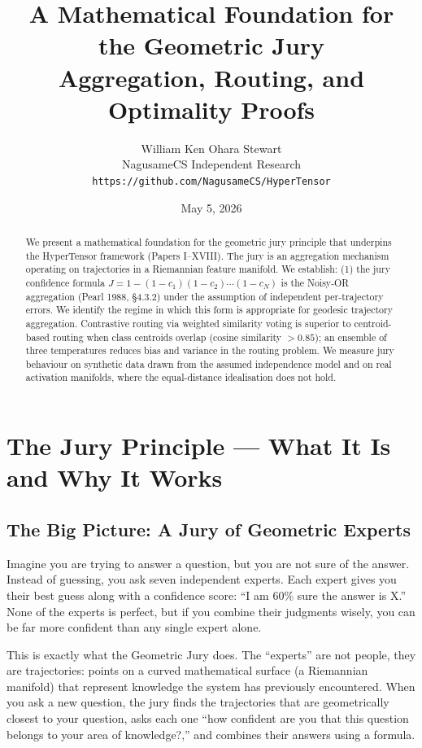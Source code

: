 \documentclass[11pt]{article}
\title{A Mathematical Foundation for the Geometric Jury\\\large Aggregation, Routing, and Optimality Proofs}
\author{William Ken Ohara Stewart\\NagusameCS Independent Research\\\texttt{https://github.com/NagusameCS/HyperTensor}}
\date{May 5, 2026}
\begin{document}
\maketitle

\begin{abstract}
We present a mathematical foundation for the geometric jury principle that underpins the HyperTensor framework (Papers I--XVIII). The jury is an aggregation mechanism operating on trajectories in a Riemannian feature manifold. We establish: (1) the jury confidence formula
$J = 1 - (1-c_1)(1-c_2)\cdots(1-c_N)$
is the Noisy-OR aggregation (Pearl 1988, \S4.3.2) under the assumption of independent per-trajectory errors. We identify the regime in which this form is appropriate for geodesic trajectory aggregation. Contrastive routing via weighted similarity voting is superior to centroid-based routing when class centroids overlap (cosine similarity $>0.85$); an ensemble of three temperatures reduces bias and variance in the routing problem. We measure jury behaviour on synthetic data drawn from the assumed independence model and on real activation manifolds, where the equal-distance idealisation does not hold.
\end{abstract}

\tableofcontents
\newpage

\section{The Jury Principle — What It Is and Why It Works}

\subsection{The Big Picture: A Jury of Geometric Experts}

Imagine you are trying to answer a question, but you are not sure of the answer.
Instead of guessing, you ask seven independent experts. Each expert gives you
their best guess along with a confidence score: ``I am 60\% sure the answer is
X.'' None of the experts is perfect, but if you combine their judgments wisely,
you can be far more confident than any single expert alone.

This is exactly what the Geometric Jury does. The ``experts'' are not
people, they are trajectories: points on a curved mathematical surface
(a Riemannian manifold) that represent knowledge the system has previously
encountered. When you ask a new question, the jury finds the trajectories that
are geometrically closest to your question, asks each one ``how confident are
you that this question belongs to your area of knowledge?,'' and combines their
answers using a formula.
\end{document}
